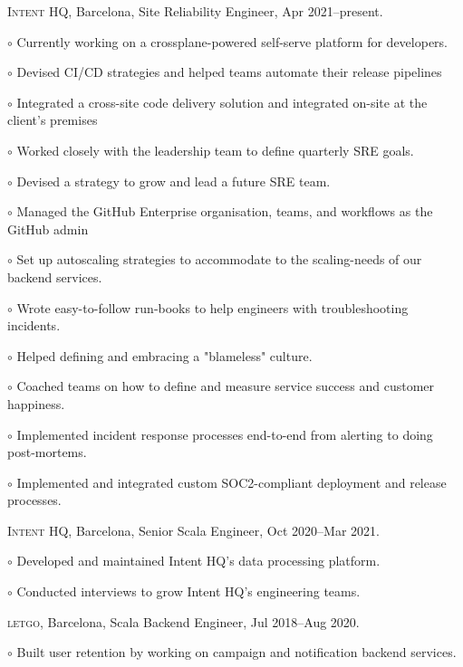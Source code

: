 \documentclass[letterpaper]{article}
\renewenvironment{itemize}{
  \begin{list}{}{
    \setlength{\leftmargin}{1.5em}
  }
}{
  \end{list}
}
\newenvironment{no-indent-itemize}{
  \begin{list}{}{
    \setlength{\leftmargin}{0em}
  }
}{
  \end{list}
}
\def\bullet{$\circ$\xspace}
\begin{document}
\begin{no-indent-itemize}
  \item \textsc{Intent HQ}, Barcelona, Site Reliability Engineer, Apr 2021--present.
  \begin{itemize}
    \item\bullet Currently working on a crossplane-powered self-serve platform for developers.
    \item\bullet Devised CI/CD strategies and helped teams automate their release pipelines
    \item\bullet Integrated a cross-site code delivery solution and integrated on-site at the client's premises
    \item\bullet Worked closely with the leadership team to define quarterly SRE goals.
    \item\bullet Devised a strategy to grow and lead a future SRE team.
    \item\bullet Managed the GitHub Enterprise organisation, teams, and workflows as the GitHub admin
    \item\bullet Set up autoscaling strategies to accommodate to the scaling-needs of our backend services.
    \item\bullet Wrote easy-to-follow run-books to help engineers with troubleshooting incidents.
    \item\bullet Helped defining and embracing a "blameless" culture.
    \item\bullet Coached teams on how to define and measure service success and customer happiness.
    \item\bullet Implemented incident response processes end-to-end from alerting to doing post-mortems.
    \item\bullet Implemented and integrated custom SOC2-compliant deployment and release processes.
  \end{itemize}
  \item \textsc{Intent HQ}, Barcelona, Senior Scala Engineer, Oct 2020--Mar 2021.
  \begin{itemize}
    \item\bullet Developed and maintained Intent HQ's data processing platform.
    \item\bullet Conducted interviews to grow Intent HQ's engineering teams.
  \end{itemize}
  \item \textsc{letgo}, Barcelona, Scala Backend Engineer, Jul 2018--Aug 2020.
  \begin{itemize}
    \item\bullet Built user retention by working on campaign and notification backend services.

\end{itemize}
\end{no-indent-itemize}
\end{document}
